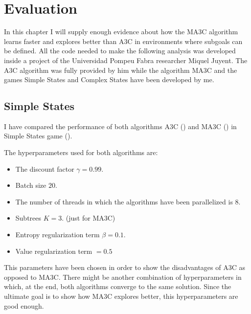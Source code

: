 \chapter{Evaluation}

In this chapter I will supply enough evidence about how the \ac{MA3C} algorithm learns faster and explores better than
\ac{A3C} in environments where subgoals can be defined.
All the code needed to make the following analysis was developed inside a project of the Universidad Pompeu Fabra researcher
Miquel Juyent.
The \ac{A3C} algorithm was fully provided by him while the algorithm \ac{MA3C} and the games Simple States and Complex
States have been developed by me.

\section{Simple States}

I have compared the performance of both algorithms \ac{A3C} () and \ac{MA3C} () in Simple
States game ().

The hyperparameters used for both algorithms are:
\begin{itemize} %
    \item The discount factor $\gamma = 0.99$.
    \item Batch size $20$. %
    \item The number of threads in which the algorithms have been parallelized is $8$.
    \item Subtrees $K = 3$. (just for \ac{MA3C})
    \item Entropy regularization term $\beta = 0.1$.
    \item Value regularization term $ = 0.5$ %
\end{itemize}

This parameters have been chosen in order to show the disadvantages of \ac{A3C} as opposed to \ac{MA3C}.
There might be another combination of hyperparameters in which, at the end, both algorithms converge to the same solution.
Since the ultimate goal is to show how \ac{MA3C} explores better, this hyperparameters are good enough.

